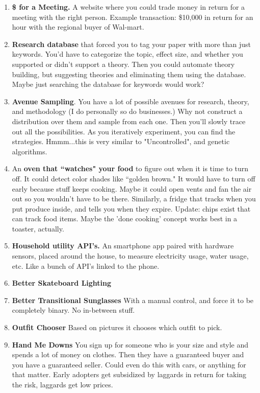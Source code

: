 \documentclass[paper=a4, fontsize=11pt]{scrartcl} %
\numberwithin{equation}{section} %
\numberwithin{figure}{section} %
\numberwithin{table}{section} %
\begin{document}
\begin{enumerate}
\item \textbf{\$ for a Meeting.}  A website where you could trade money in return for a meeting with the right person.  Example transaction: 
\$10,000 in return for an hour with the regional buyer of Wal-mart.

\item \textbf{Research database} that forced you to tag your paper with more than just keywords.  You'd have to categorize the topic, effect size, and whether you supported or didn't support a theory.  Then you could automate theory building, but suggesting theories and eliminating them using the database.  Maybe just searching the database for keywords would work?  

\item \textbf{Avenue Sampling}.  You have a lot of possible avenues for research, theory, and methodology (I 
do personally so do businesses.)  Why not construct a distribution over them
and sample from each one.  Then you'll slowly trace out all the possibilities.  As
you iteratively experiment, you can find the strategies.  Hmmm...this is very
similar to "Uncontrolled", and genetic algorithms.  

\item An \textbf{oven that ``watches" your food} to figure out when it is time to turn off.  It could detect color shades like ``golden brown."  It would have to turn off early because stuff keeps cooking.  Maybe it could open vents and fan the air out so you wouldn't have to be there.  Similarly, a fridge that tracks when you put produce inside, and tells you when they expire.  Update: chips exist that can track food items.  Maybe the 'done cooking' concept works best in a toaster, actually.

\item \textbf{Household utility API's.}  An smartphone app paired with hardware sensors, placed around the house, to measure electricity usage, water usage, etc.  Like a bunch of API's linked to the phone.

\item \textbf{Better Skateboard Lighting}

\item \textbf{Better Transitional Sunglasses}  With a manual control, and force it to be completely binary.  No in-between stuff.

\item \textbf{Outfit Chooser}  Based on pictures it chooses which outfit to pick.

\item \textbf{Hand Me Downs}  You sign up for someone who is your size and style and spends a lot of money on clothes.  Then they have a guaranteed buyer and you have a guaranteed seller.  Could even do this with cars, or anything for that matter.  Early adopters get subsidized by laggards in return for taking the risk, laggards get low prices.


\end{enumerate}
\end{document}
